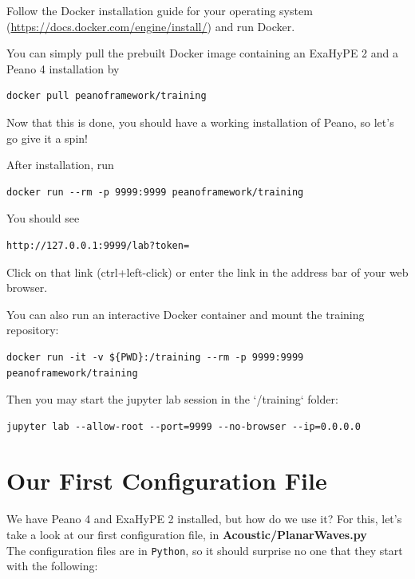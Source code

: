 \documentclass[12pt,letterpaper]{article}
\begin{document}
Follow the Docker installation guide for your operating system (\url{https://docs.docker.com/engine/install/}) and run Docker.

You can simply pull the prebuilt Docker image containing an ExaHyPE 2 and a Peano 4 installation by

\begin{lstlisting}[style = Bash]
docker pull peanoframework/training
\end{lstlisting}

Now that this is done, you should have a working installation of Peano, so let's go give it a spin!

After installation, run

\begin{lstlisting}[style = Bash]
docker run --rm -p 9999:9999 peanoframework/training
\end{lstlisting}

You should see

\begin{lstlisting}[style = Bash]
http://127.0.0.1:9999/lab?token=
\end{lstlisting}

Click on that link (ctrl+left-click) or enter the link in the address bar of your web browser.

You can also run an interactive Docker container and mount the training repository:

\begin{lstlisting}[style = Bash]
docker run -it -v ${PWD}:/training --rm -p 9999:9999 peanoframework/training
\end{lstlisting}

Then you may start the jupyter lab session in the `/training` folder:

\begin{lstlisting}[style = Bash]
jupyter lab --allow-root --port=9999 --no-browser --ip=0.0.0.0
\end{lstlisting}

\newpage

\section{Our First Configuration File}
\label{section_3}

We have Peano 4 and ExaHyPE 2 installed, but how do we use it? For this, let's take a look at our first configuration file, in \textbf{Acoustic/PlanarWaves.py}\\
The configuration files are in \texttt{Python}, so it should surprise no one that they start with the following:\\
\end{document}
